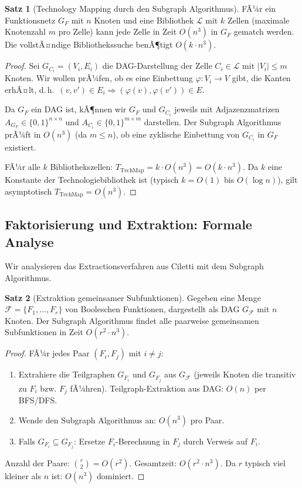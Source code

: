 ﻿\documentclass[a4paper,12pt]{article}
\theoremstyle{definition}
\newtheorem{satz}{Satz}
\begin{document}
\begin{satz}[Technology Mapping durch den Subgraph Algorithmus]\label{satz:techmap}
  FÃ¼r ein Funktionsnetz $G_F$ mit $n$ Knoten und eine Bibliothek $\mathcal{L}$ mit $k$
  Zellen (maximale Knotenzahl $m$ pro Zelle) kann jede Zelle in Zeit $O(n^3)$ in $G_F$
  gematch werden. Die vollstÃ¤ndige Bibliothekssuche benÃ¶tigt $O(k \cdot n^3)$.
\end{satz}

\begin{proof}
  Sei $G_{C_i} = (V_i, E_i)$ die DAG-Darstellung der Zelle $C_i \in \mathcal{L}$ mit
  $|V_i| \leq m$ Knoten. Wir wollen prÃ¼fen, ob es eine Einbettung $\varphi: V_i \to V$
  gibt, die Kanten erhÃ¤lt, d.\,h.\ $(v, v') \in E_i \Rightarrow (\varphi(v), \varphi(v')) \in E$.

  Da $G_F$ ein DAG ist, kÃ¶nnen wir $G_F$ und $G_{C_i}$ jeweils mit Adjazenzmatrizen
  $A_{G_F} \in \{0,1\}^{n \times n}$ und $A_{C_i} \in \{0,1\}^{m \times m}$ darstellen.
  Der Subgraph Algorithmus prÃ¼ft in $O(n^3)$ (da $m \leq n$), ob eine
  zyklische Einbettung von $G_{C_i}$ in $G_F$ existiert.

  FÃ¼r alle $k$ Bibliothekszellen: $T_{\text{TechMap}} = k \cdot O(n^3) = O(k \cdot n^3)$.
  Da $k$ eine Konstante der Technologiebibliothek ist (typisch $k = O(1)$ bis $O(\log n)$),
  gilt asymptotisch $T_{\text{TechMap}} = O(n^3)$.
\end{proof}

\subsection{Faktorisierung und Extraktion: Formale Analyse}

Wir analysieren das Extractionsverfahren aus Ciletti \cite[S.~239, Beispiel 6.2]{ciletti2011}
mit dem Subgraph Algorithmus.

\begin{satz}[Extraktion gemeinsamer Subfunktionen]\label{satz:extraktion}
  Gegeben eine Menge $\mathcal{F} = \{F_1, \ldots, F_r\}$ von Booleschen Funktionen,
  dargestellt als DAG $G_{\mathcal{F}}$ mit $n$ Knoten. Der Subgraph Algorithmus findet
  alle paarweise gemeinsamen Subfunktionen in Zeit $O(r^2 \cdot n^3)$.
\end{satz}

\begin{proof}
  FÃ¼r jedes Paar $(F_i, F_j)$ mit $i \neq j$:
  \begin{enumerate}
    \item Extrahiere die Teilgraphen $G_{F_i}$ und $G_{F_j}$ aus $G_{\mathcal{F}}$
          (jeweils Knoten die transitiv zu $F_i$ bzw. $F_j$ fÃ¼hren).
          Teilgraph-Extraktion aus DAG: $O(n)$ per BFS/DFS.
    \item Wende den Subgraph Algorithmus an: $O(n^3)$ pro Paar.
    \item Falls $G_{F_i} \subseteq G_{F_j}$: Ersetze $F_i$-Berechnung in $F_j$ durch
          Verweis auf $F_i$.
  \end{enumerate}
  Anzahl der Paare: $\binom{r}{2} = O(r^2)$. Gesamtzeit: $O(r^2 \cdot n^3)$.
  Da $r$ typisch viel kleiner als $n$ ist: $O(n^3)$ dominiert.
\end{proof}
\end{document}
